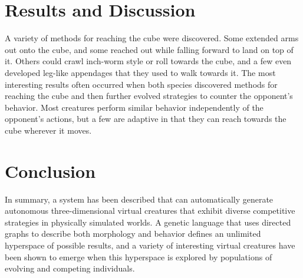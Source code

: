 \documentclass[../main.tex]{subfiles}
\begin{document}
\section{Results and Discussion}

A variety of methods for reaching the cube were discovered. Some extended arms out onto the cube, and some reached out
while falling forward to land on top of it. Others could crawl inch-worm style or roll towards the cube, and a few even
developed leg-like appendages that they used to walk towards it. The most interesting results often occurred when both
species discovered methods for reaching the cube and then further evolved strategies to counter the opponent's
behavior. Most creatures perform similar behavior independently of the opponent's actions, but a few are adaptive in
that they can reach towards the cube wherever it moves.

\section{Conclusion}

In summary, a system has been described that can automatically generate autonomous three-dimensional virtual creatures
that exhibit diverse competitive strategies in physically simulated worlds. A genetic language that uses directed
graphs to describe both morphology and behavior defines an unlimited hyperspace of possible results, and a variety of
interesting virtual creatures have been shown to emerge when this hyperspace is explored by populations of evolving and
competing individuals.
\end{document}
